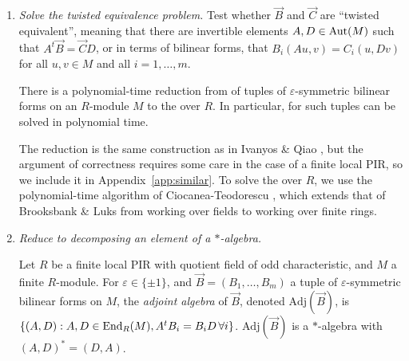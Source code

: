 \begin{enumerate}
\item \textit{Solve the twisted equivalence problem.} Test whether $\vec{B}$ and $\vec{C}$ are ``twisted equivalent'', meaning that there are invertible elements $A,D \in \mathrm{Aut}(M)$ such that $A^t \vec{B} = \vec{C} D$, or in terms of bilinear forms, that $B_i(Au, v) = C_i(u, Dv)$ for all $u,v \in M$ and all $i=1,\dotsc,m$.

\begin{lemma} \label{lem:twisted}
There is a polynomial-time reduction from  of tuples of $\varepsilon$-symmetric bilinear forms on an $R$-module $M$ to the  over $R$. In particular,  for such tuples can be solved in polynomial time.
\end{lemma}

The reduction is the same construction as in Ivanyos \& Qiao \cite[Prop.~3.2]{IQ19}, but the argument of correctness requires some care in the case of a finite local PIR, so we include it in Appendix~\ref{app:similar}. To solve the  over $R$, we use the polynomial-time algorithm of Ciocanea-Teodorescu \cite{CT}, which extends that of Brooksbank \& Luks \cite{BL08} from working over fields to working over finite rings.

\item \textit{Reduce to decomposing an element of a $*$-algebra.}

\newcommand{\adj}{\text{Adj}}

\begin{definition}[{cf. \cite[Def.~2.3]{IQ19}}]
Let $R$ be a finite local PIR with quotient field of odd characteristic, and $M$ a finite $R$-module. For $\varepsilon \in \{\pm 1\}$, and $\vec{B} = (B_1, \dotsc, B_m)$ a tuple of $\varepsilon$-symmetric bilinear forms on $M$, the \emph{adjoint algebra} of $\vec{B}$, denoted $\adj(\vec{B})$, is $\{(A,D) : A,D \in \mathrm{End}_R(M), A^t B_i = B_i D \,\forall i\}$. $\adj(\vec{B})$ is a $*$-algebra with $(A,D)^* = (D,A)$.
\end{definition}


\end{enumerate}
